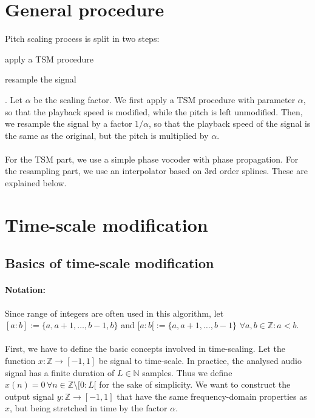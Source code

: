\documentclass[letterpaper]{article}
\begin{document}
\section{General procedure}
Pitch scaling process is split in two steps: \begin{enumerate*}[label=\arabic*)]
\item apply a TSM procedure \item resample the signal\end{enumerate*}. Let
\(\alpha\) be the scaling factor. We first apply a TSM procedure with parameter
\(\alpha\), so that the playback speed is modified, while the pitch is left
unmodified. Then, we resample the signal by a factor \(1/\alpha\), so that the
playback speed of the signal is the same as the original, but the pitch is
multiplied by \(\alpha\).
\paragraph{}
For the TSM part, we use a simple phase vocoder with phase propagation. For the
resampling part, we use an interpolator based on 3rd order splines. These are
explained below.

\section{Time-scale modification}
\subsection{Basics of time-scale modification}
\paragraph{Notation:} Since range of integers are often used in this algorithm,
let  \([a:b]:=\{a,a+1,\dots,b-1,b\}\) and \([a:b[:=\{a,a+1,\dots,b-1\}\)
\(\forall a,b\in\mathbb{Z}:a<b\).
\paragraph{}
First, we have to define the basic concepts involved in time-scaling. Let the
function \(x:\mathbb{Z}\to[-1, 1]\) be signal to time-scale. In practice,
the analysed audio signal has a finite duration of \(L\in\mathbb{N}\) samples.
Thus we define \(x(n)=0\,\forall n\in\mathbb{Z}\setminus [0:L[ \) for the sake
of simplicity. We want to construct the output signal
\(y:\mathbb{Z}\to[-1, 1]\) that have the same frequency-domain properties as
\(x\), but being stretched in time by the factor \(\alpha\).
\end{document}

